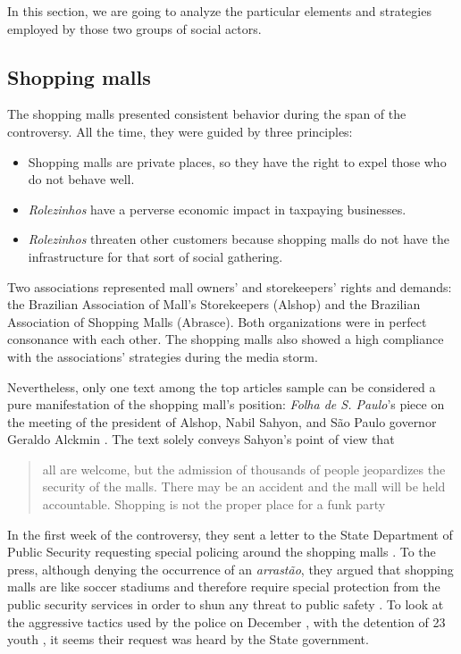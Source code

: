 In this section, we are going to analyze the particular elements and strategies employed by those two groups of social actors.

\subsection{Shopping malls}

The shopping malls presented consistent behavior during the span of the controversy. All the time, they were guided by three principles:
\begin{itemize}
\item Shopping malls are private places, so they have the right to expel those who do not behave well.
\item \emph{Rolezinhos} have a perverse economic impact in taxpaying businesses.
\item \emph{Rolezinhos} threaten other customers because shopping malls do not have the infrastructure for that sort of social gathering.
\end{itemize}

Two associations represented mall owners' and storekeepers' rights and demands: the Brazilian Association of Mall's Storekeepers (Alshop) and the Brazilian Association of Shopping Malls (Abrasce). Both organizations were in perfect consonance with each other. The shopping malls also showed a high compliance with the associations' strategies during the media storm.

Nevertheless, only one text among the top articles sample can be considered a pure manifestation of the shopping mall's position: \emph{Folha de S. Paulo}'s piece on the meeting of the president of Alshop, Nabil Sahyon, and São Paulo governor Geraldo Alckmin \autocite{folha_shoppings_rolezodromos}. The text solely conveys Sahyon's point of view that \blockcquote{folha_shoppings_rolezodromos}[.]{all are welcome, but the admission of thousands of people jeopardizes the security of the malls. There may be an accident and the mall will be held accountable. Shopping is not the proper place for a funk party}

In the first week of the controversy, they sent a letter to the State Department of Public Security requesting special policing around the shopping malls \autocite{uol_policiamento_shopping}. To the press, although denying the occurrence of an \emph{arrastão}, they argued that shopping malls are like soccer stadiums and therefore require special protection from the public security services in order to shun any threat to public safety \autocite{estado_novas_invasoes}. To look at the aggressive tactics used by the police on December , with the detention of 23 youth \autocite{folha_guarulhos}, it seems their request was heard by the State government.

